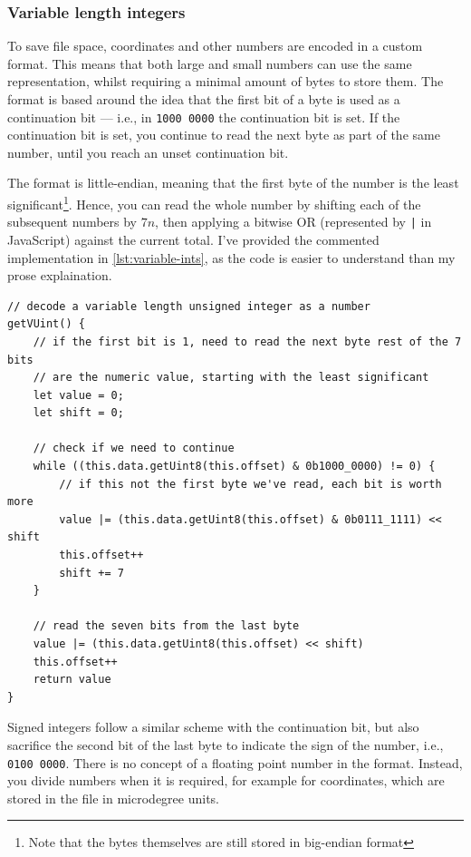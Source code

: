 \documentclass{final_report}
\begin{document}
\subsubsection{Variable length integers}

To save file space, coordinates and other numbers are encoded in a custom format. This means that both large and small numbers can use the same representation, whilst requiring a minimal amount of bytes to store them. The format is based around the idea that the first bit of a byte is used as a continuation bit --- i.e., in \texttt{1000 0000} the continuation bit is set. If the continuation bit is set, you continue to read the next byte as part of the same number, until you reach an unset continuation bit.

The format is little-endian, meaning that the first byte of the number is the least significant\footnote{Note that the bytes themselves are still stored in big-endian format}. Hence, you can read the whole number by shifting each of the subsequent numbers by \(7n\), then applying a bitwise OR (represented by \texttt{|} in JavaScript) against the current total. I've provided the commented implementation in \autoref{lst:variable-ints}, as the code is easier to understand than my prose explaination. 

\begin{lstlisting}[caption=Parsing variable length integers, label=lst:variable-ints]
// decode a variable length unsigned integer as a number
getVUint() {
    // if the first bit is 1, need to read the next byte rest of the 7 bits
    // are the numeric value, starting with the least significant
    let value = 0;
    let shift = 0;

    // check if we need to continue
    while ((this.data.getUint8(this.offset) & 0b1000_0000) != 0) {
        // if this not the first byte we've read, each bit is worth more
        value |= (this.data.getUint8(this.offset) & 0b0111_1111) << shift
        this.offset++
        shift += 7
    }

    // read the seven bits from the last byte
    value |= (this.data.getUint8(this.offset) << shift)
    this.offset++
    return value
}
\end{lstlisting}

Signed integers follow a similar scheme with the continuation bit, but also sacrifice the second bit of the last byte to indicate the sign of the number, i.e., \texttt{0100 0000}. There is no concept of a floating point number in the format. Instead, you divide numbers when it is required, for example for coordinates, which are stored in the file in microdegree units.
\end{document}
